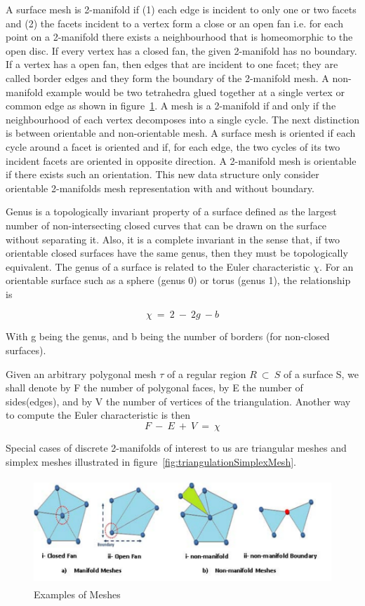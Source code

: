 \documentclass{InsightArticle}
\begin{document}
A surface mesh is 2-manifold if (1) each edge is incident to only one or two facets and (2) the facets incident to a vertex form a close or an open fan i.e. for each point on a 2-manifold there exists a neighbourhood that is homeomorphic to the open disc. If every vertex has a closed fan, the given 2-manifold has no boundary. If a vertex has a open fan, then edges that are incident to one facet; they are called border edges and they form the boundary of the 2-manifold mesh. A non-manifold example would be two tetrahedra glued together at a single vertex or common edge as shown in figure~\ref{fig:meshes}. A mesh is a 2-manifold if and only if the neighbourhood of each vertex decomposes into a single cycle. The next distinction is between orientable and non-orientable mesh. A surface mesh is oriented if each cycle around a facet is oriented and if, for each edge, the two cycles of its two incident facets are oriented in opposite direction. A 2-manifold mesh is orientable if there exists such an orientation. This new data structure only consider orientable 2-manifolds mesh representation with and without boundary. 

Genus is a topologically invariant property of a surface defined as the largest number of non-intersecting closed curves that can be drawn on the surface without separating it. Also, it is a complete invariant in the sense that, if two orientable closed surfaces have the same genus, then they must be topologically equivalent. The genus of a surface is related to the Euler characteristic $\chi$. For an orientable surface such as a sphere (genus 0) or torus (genus 1), the relationship is

\begin{equation}
\chi~=~2~-~2g~-b
\end{equation}

With g being the genus, and b being the number of borders (for non-closed surfaces). 

Given an arbitrary polygonal mesh $\tau$ of a regular region $R~\subset~S$ of a surface S, we shall denote by F the number of polygonal faces, by E the number of sides(edges), and by V the number of vertices of the triangulation. Another way to compute the Euler characteristic is then
\begin{equation}
F~-~E~+~V~=~\chi
\end{equation}


Special cases of discrete 2-manifolds of interest to us are triangular meshes and simplex meshes illustrated in figure~\ref{fig:triangulationSimplexMesh}.
\begin{figure}[!t]
	\centering
	\includegraphics[width=155mm, height=40mm]{Meshes}
	\caption{Examples of Meshes}
	\label{fig:meshes}
\end{figure}
\end{document}
